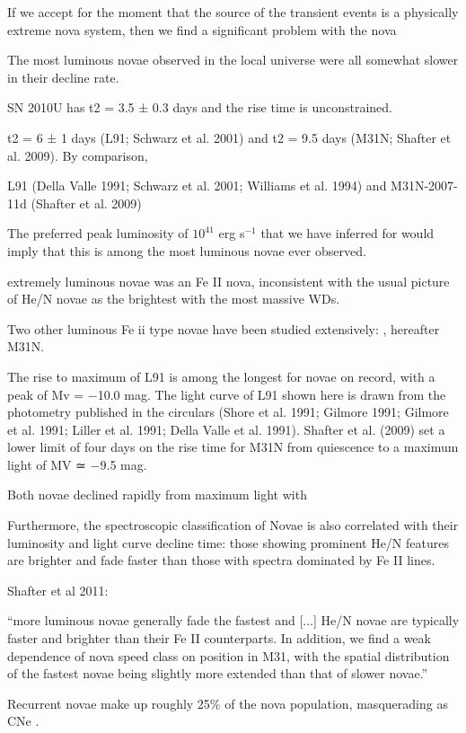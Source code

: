 


If we accept for the moment that the source of the \spock transient
events is a physically extreme nova system, then we find a significant
problem with the nova 

The most luminous novae observed in the local
universe were all somewhat slower in their decline rate.

SN 2010U has t2 = 3.5 ± 0.3 days and the rise time is unconstrained.

t2 = 6 ± 1 days (L91; Schwarz et al. 2001) and t2 = 9.5 days (M31N; Shafter et al. 2009). By comparison, 

L91 (Della Valle 1991; Schwarz et al. 2001; Williams et al. 1994) and M31N-2007-11d (Shafter et al. 2009)

The preferred peak luminosity of
$10^{41}$ erg s$^{-1}$ that we have inferred for \spock would imply
that this is among the most luminous novae ever observed.



extremely luminous novae \citep{Czekala:2013}
was an Fe II nova, inconsistent with the usual picture of He/N novae as the brightest with the most massive WDs.

Two other luminous Fe ii type novae have been studied extensively: , hereafter M31N.

The rise to maximum of L91 is among the longest for novae on record, with a peak of Mv = −10.0 mag. The light curve of L91 shown here is drawn from the photometry published in the circulars (Shore et al. 1991; Gilmore 1991; Gilmore et al. 1991; Liller et al. 1991; Della Valle et al. 1991). Shafter et al. (2009) set a lower limit of four days on the rise time for M31N from quiescence to a maximum light of MV ≃ −9.5 mag.

Both novae declined rapidly from maximum light with 



Furthermore, the spectroscopic classification
of Novae is also correlated with their luminosity and light curve
decline time: those showing prominent He/N features are brighter and
fade faster than those with spectra dominated by Fe II lines.


Shafter et al 2011:

``more luminous novae generally fade the fastest and [...]  He/N novae
are typically faster and brighter than their Fe II counterparts. In
addition, we find a weak dependence of nova speed class on position in
M31, with the spatial distribution of the fastest novae being slightly
more extended than that of slower novae.''


Recurrent novae make up roughly 25\% of the nova population,
masquerading as CNe \citep{Pagnotta:2014}.
